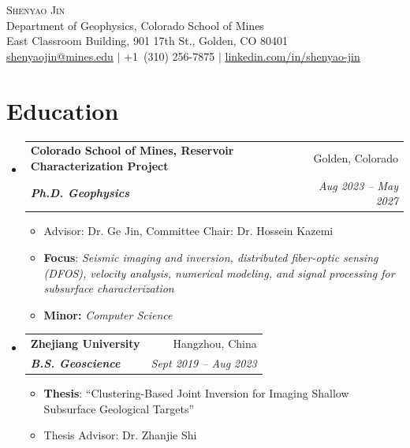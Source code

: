 \documentclass[letterpaper,13pt]{article}
\makeatletter
\newcommand{\resumeItem}[1]{\item\small{{#1 \vspace{-2pt}}}}
\newcommand{\resumeSubheading}[4]{
  \vspace{-2pt}\item
    \begin{tabular*}{0.97\textwidth}[t]{l@{\extracolsep{\fill}}r}
      \textbf{#1} & #2 \\
      \textit{\small#3} & \textit{\small #4} \\
    \end{tabular*}\vspace{-7pt}
}
\newcommand{\resumeItemListStart}{\begin{itemize}[label={\small$\bullet$}]}
\newcommand{\resumeItemListEnd}{\end{itemize}\vspace{-5pt}}
\newcommand{\resumeSubHeadingListStart}{\begin{itemize}[leftmargin=0.15in, label={}]}
\newcommand{\resumeSubHeadingListEnd}{\end{itemize}}
\makeatother
\begin{document}
\begin{center}
    {\Huge \scshape Shenyao Jin} \\ \vspace{1pt}
    \small Department of Geophysics, Colorado School of Mines \\
    \small East Classroom Building, 901 17th St., Golden, CO 80401 \\
    \small \underline{shenyaojin@mines.edu} $|$ {+1\ (310) 256-7875} $|$ \href{https://www.linkedin.com/in/shenyao-jin/}{\underline{linkedin.com/in/shenyao-jin}} \\
\end{center}

\section{Education}
\resumeSubHeadingListStart

\resumeSubheading
  {Colorado School of Mines, Reservoir Characterization Project}{Golden, Colorado}
  {\textbf{Ph.D. Geophysics}}{Aug 2023 -- May 2027}
  \resumeItemListStart
    \resumeItem{Advisor: Dr. Ge Jin, Committee Chair: Dr. Hossein Kazemi}
    \resumeItem{\textbf{Focus}: \textit{Seismic imaging and inversion, distributed fiber-optic sensing (DFOS), velocity analysis, numerical modeling, and signal processing for subsurface characterization}}
    \resumeItem{\textbf{Minor:} \textit{Computer Science}}
  \resumeItemListEnd

\resumeSubheading
  {Zhejiang University}{Hangzhou, China}
  {\textbf{B.S. Geoscience}}{Sept 2019 -- Aug 2023}
  \resumeItemListStart
    \resumeItem{\textbf{Thesis}: ``Clustering-Based Joint Inversion for Imaging Shallow Subsurface Geological Targets''}
    \resumeItem{Thesis Advisor: Dr. Zhanjie Shi}
  \resumeItemListEnd

\resumeSubHeadingListEnd

\end{document}
